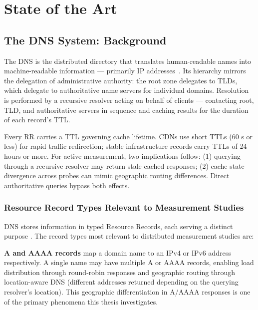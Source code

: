 \chapter{State of the Art}
\label{ch:state-of-the-art}

\section{The DNS System: Background}
\label{subsec:2.1}

The \ac{DNS} is the distributed directory that translates human-readable names into machine-readable information — primarily \ac{IP} addresses~\cite{RFC1034,RFC1035}. Its hierarchy mirrors the delegation of administrative authority: the root zone delegates to \ac{TLD}s, which delegate to authoritative name servers for individual domains. Resolution is performed by a recursive resolver acting on behalf of clients — contacting root, \ac{TLD}, and authoritative servers in sequence and caching results for the duration of each record’s \ac{TTL}.

Every \ac{RR} carries a \ac{TTL} governing cache lifetime. \ac{CDN}s use short \ac{TTL}s (60 s or less) for rapid traffic redirection; stable infrastructure records carry \ac{TTL}s of 24 hours or more. For active measurement, two implications follow: (1) querying through a recursive resolver may return stale cached responses; (2) cache state divergence across probes can mimic geographic routing differences. Direct authoritative queries bypass both effects.

\subsection{Resource Record Types Relevant to Measurement Studies}
\label{sec:2.1.1}

\ac{DNS} stores information in typed Resource Records, each serving a distinct purpose \cite{RFC1035}. The record types most relevant to distributed measurement studies are:

\textbf{\ac{A} and \ac{AAAA} records} map a domain name to an \ac{IPv4} or \ac{IPv6} address respectively. A single name may have multiple \ac{A} or \ac{AAAA} records, enabling load distribution through round-robin responses and geographic routing through location-aware \ac{DNS} (different addresses returned depending on the querying resolver's location). This geographic differentiation in \ac{A}/\ac{AAAA} responses is one of the primary phenomena this thesis investigates.

